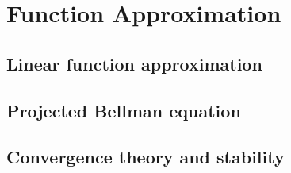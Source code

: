 
\section{Function Approximation}

\subsection{Linear function approximation}


\subsection{Projected Bellman equation}


\subsection{Convergence theory and stability}

